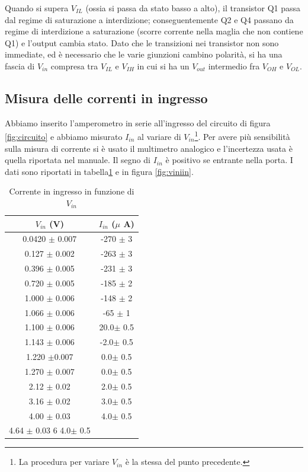 \documentclass[10pt,a4paper]{article}
\begin{document}
Quando si supera $V_{IL}$ (ossia si passa da stato basso a alto), il transistor Q1 passa dal regime di saturazione a interdizione; conseguentemente Q2 e Q4 passano da regime di interdizione a saturazione (scorre corrente nella maglia che non contiene Q1) e l'output cambia stato. Dato che le transizioni nei transistor non sono immediate, ed è necessario che le varie giunzioni cambino polarità, si ha una fascia di $V_{in}$ compresa tra $V_{IL}$ e $V_{IH}$ in cui si ha un $V_{out}$ intermedio fra $V_{OH}$ e $V_{OL}$.
 
\subsection{Misura delle correnti in ingresso}
Abbiamo inserito l'amperometro in serie all'ingresso del circuito di figura \ref{fig:circuito} e abbiamo misurato $I_{in}$ al variare di $V_{in}$\footnote{La procedura per variare $V_{in}$ è la stessa del punto precedente.}. Per avere più sensibilità sulla misura di corrente si è usato il multimetro analogico e l'incertezza usata è quella riportata nel manuale. Il segno di $I_{in}$ è positivo se entrante nella porta.
I dati sono riportati in tabella\ref{tab:viniin} e in figura \ref{fig:viniin}.
\begin{table}[!htb]
\centering
\begin{tabular}{|c|c|}
\hline
$V_{in}$ (V) & $I_{in}$ ($\mu$ A)\\
\hline
0.0420 $\pm$ 0.007 & -270 $\pm$ 3\\
0.127 $\pm$ 0.002 & -263 $\pm$ 3\\
0.396 $\pm$ 0.005 & -231 $\pm$ 3\\
0.720 $\pm$ 0.005 & -185 $\pm$ 2\\
1.000 $\pm$ 0.006 & -148 $\pm$ 2\\
1.066 $\pm$ 0.006 & -65 $\pm$ 1\\
1.100 $\pm$ 0.006 & 20.0$\pm$ 0.5 \\
1.143 $\pm$ 0.006 & -2.0$\pm$ 0.5\\
1.220 $\pm$0.007 & 0.0$\pm$ 0.5\\
1.270 $\pm$ 0.007 & 0.0$\pm$ 0.5\\
2.12 $\pm$ 0.02 & 2.0$\pm$ 0.5\\
3.16 $\pm$ 0.02 & 3.0$\pm$ 0.5\\
4.00 $\pm$ 0.03 & 4.0$\pm$ 0.5\\
4.64 $\pm$ 0.03 6 4.0$\pm$ 0.5\\
\hline
\end{tabular}
\caption{Corrente in ingresso in funzione di $V_{in}$\label{tab:viniin}}
\end{table}
\end{document}
